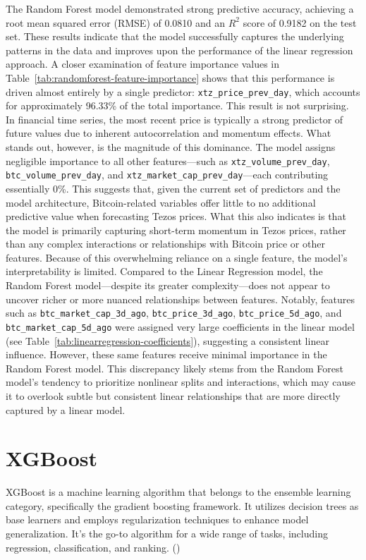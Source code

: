 The Random Forest model demonstrated strong predictive accuracy, achieving a root mean squared error (RMSE) of 0.0810 and an $R^2$ score of 0.9182 on the test set. 
These results indicate that the model successfully captures the underlying patterns in the data and improves upon the performance of the linear regression approach.
A closer examination of feature importance values in Table~\ref{tab:randomforest-feature-importance} shows that this performance is driven almost entirely by a single predictor: \texttt{xtz\_price\_prev\_day}, which accounts for approximately 96.33\% of the total importance. 
This result is not surprising. In financial time series, the most recent price is typically a strong predictor of future values due to inherent autocorrelation and momentum effects.
What stands out, however, is the magnitude of this dominance.
The model assigns negligible importance to all other features—such as \texttt{xtz\_volume\_prev\_day}, \texttt{btc\_volume\_prev\_day}, and \texttt{xtz\_market\_cap\_prev\_day}—each contributing essentially 0\%. 
This suggests that, given the current set of predictors and the model architecture, Bitcoin-related variables offer little to no additional predictive value when forecasting Tezos prices. What this also indicates is that the model is primarily capturing short-term momentum in Tezos prices, rather than any complex interactions or relationships with Bitcoin price or other features.
Because of this overwhelming reliance on a single feature, the model's interpretability is limited. 
Compared to the Linear Regression model, the Random Forest model—despite its greater complexity—does not appear to uncover richer or more nuanced relationships between features. 
Notably, features such as \texttt{btc\_market\_cap\_3d\_ago}, \texttt{btc\_price\_3d\_ago}, \texttt{btc\_price\_5d\_ago}, and \texttt{btc\_market\_cap\_5d\_ago} were assigned very large coefficients in the linear model (see Table~\ref{tab:linearregression-coefficients}), suggesting a consistent linear influence. 
However, these same features receive minimal importance in the Random Forest model. This discrepancy likely stems from the Random Forest model’s tendency to prioritize nonlinear splits and interactions, which may cause it to overlook subtle but consistent linear relationships that are more directly captured by a linear model.

\section{XGBoost}
\label{sec:xgboost}
XGBoost is a machine learning algorithm that belongs to the ensemble learning category, specifically the gradient boosting framework. 
It utilizes decision trees as base learners and employs regularization techniques to enhance model generalization.
It’s the go-to algorithm for a wide range of tasks, including regression, classification, and ranking. (\cite{tyagi2025xgboost})

